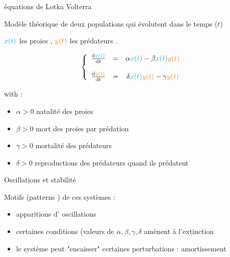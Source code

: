 \documentclass[11,aspectratio=1610]{beamer}
\begin{document}
\begin{frame}{équations de Lotka Volterra }


Modèle théorique de deux populations qui évolutent dans le temps ($t$)

$\color{cyan}{x(t)}$ les proies , $\color{orange}{y(t)}$ les prédateurs .


\[
\left\{
 \begin{array}{ccc}  
 \frac{\mathrm{d}\textcolor{cyan}{x(t)}}{\mathrm{d}t}&=&  \alpha \textcolor{cyan}{x(t)} - \beta \textcolor{cyan}{x(t)}\textcolor{orange}{y(t)}\\
 \\
\frac{\mathrm{d}\textcolor{orange}{y(t)}}{\mathrm{d}t}&=&  \delta \textcolor{cyan}{x(t)}\textcolor{orange}{y(t)} - \gamma \textcolor{orange}{y(t)}  \end{array}
\right.
\]

  

with : 
\begin{footnotesize}
\begin{itemize}
  \item  $\alpha >0$ natalité des proies 
  \item  $\beta >0 $ mort des proies par prédation
  \item  $\gamma >0 $ mortalité des prédateurs
  \item  $\delta > 0$  reproductions des prédateurs quand ils prédatent
\end{itemize}
\end{footnotesize}
\end{frame}







\begin{frame}{Oscillations et stabilité}


\alert{Motifs} (patterns ) de ces systèmes   : 

\begin{itemize}
  \item apparitions d' \alert{oscillations}
  \item certaines conditions (valeurs de $\alpha,\beta, \gamma, \delta$ amènent à \alert{l'extinction}
  \item le système peut "encaisser" certaines perturbations : \alert{amortissement}
\end{itemize}

  
\end{frame}
\end{document}
